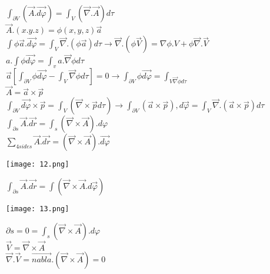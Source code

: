 \documentclass[12]{article}
\begin{document}
$\int_{\partial V}(\vec{A}.\vec{d \varphi}) = \int_{V}(\vec{\nabla}.\vec{A})d \tau$\\

$\vec{A}.(x.y.z)=\phi (x,y,z) \vec{a}$\\

$\int \phi \vec{a}.\vec{d \varphi}= \int_{V} \vec{\nabla}.(\phi \vec{a})d \tau \rightarrow \vec{\nabla}. (\phi \vec{V})=\nabla \phi . V+\phi \vec{\nabla}.\vec{V}$\\

$a.\int \phi \vec{d \varphi}=\int_{v}a.\vec{\nabla} \phi d \tau$\\

$\vec{a}\left[\int_{\partial V}\phi \vec{d \varphi}-\int_{V}\vec{\nabla} \phi d \tau \right] = 0 \rightarrow \int_{\partial V} \phi \vec{d\varphi}=\int_{V \vec{\nabla} \phi d \tau}$\\

$\vec{A}=\vec{a}\times\vec{p}$\\

$\int_{\partial V}\vec{d \varphi}\times \vec{p}=\int_{V}(\vec{\nabla}\times \vec{p}d \tau) \rightarrow\int_{\partial V}(\vec{a}\times \vec{p}), d \vec{\varphi}=\int_{V}\vec{\nabla}.(\vec{a}\times \vec{p})d \tau$\\


$\int_{\partial s}\vec{A}.\vec{dr}=\int_{s}(\vec{\nabla}\times \vec{A}). d \varphi$\\

$\sum_{4 sides}\vec{A}.\vec{dr}=(\vec{\nabla} \times \vec{A}).\vec{d \varphi}$\\

\begin{center}
\texttt{[image: 12.png]}
\end{center}

$\int_{\partial s}\vec{A}.\vec{dr}=\int(\vec{\nabla}\times\vec{A}. d \vec{\varphi})$

\begin{center}
\texttt{[image: 13.png]}
\end{center}

\newpage
$\partial s=0=\int_{s}(\vec{\nabla}\times \vec{A}).d \varphi$\\

$\vec{V}=\vec{\nabla}\times\vec{A}$\\

$\vec{\nabla}.\vec{V}=\vec{nabla}.(\vec{\nabla}\times\vec{A})=0$\\
\end{document}
